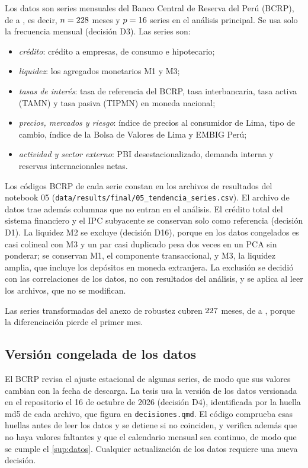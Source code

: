 Los datos son \nSeries{} series mensuales del Banco Central de Reserva del Perú (BCRP), de
\fechaInicioNiveles{} a \fechaFinDatos{}, es decir, $n=228$ meses y $p=16$ series
en el análisis principal. Se usa solo la frecuencia mensual (decisión D3). Las series son:

\begin{itemize}[leftmargin=*]
  \item \emph{crédito}: crédito a empresas, de consumo e hipotecario;
  \item \emph{liquidez}: los agregados monetarios M1 y M3;
  \item \emph{tasas de interés}: tasa de referencia del BCRP, tasa interbancaria, tasa activa (TAMN)
    y tasa pasiva (TIPMN) en moneda nacional;
  \item \emph{precios, mercados y riesgo}: índice de precios al consumidor de Lima, tipo de cambio,
    índice de la Bolsa de Valores de Lima y EMBIG Perú;
  \item \emph{actividad y sector externo}: PBI desestacionalizado, demanda interna y reservas
    internacionales netas.
\end{itemize}

Los códigos BCRP de cada serie constan en los archivos de resultados del notebook 05
(\texttt{data/results/final/05\_tendencia\_series.csv}). El archivo de datos trae además columnas
que no entran en el análisis. El crédito total del sistema financiero y el IPC subyacente se
conservan solo como referencia (decisión D1). La liquidez M2 se excluye (decisión D16), porque en
los datos congelados es casi colineal con M3 y un par casi duplicado pesa dos veces en un PCA sin
ponderar; se conservan M1, el componente transaccional, y M3, la liquidez amplia, que incluye los
depósitos en moneda extranjera. La exclusión se decidió con las correlaciones de los datos, no con
resultados del análisis, y se aplica al leer los archivos, que no se modifican.

Las series transformadas del anexo de robustez cubren $227$ meses, de
\fechaInicioTransformadas{} a \fechaFinDatos{}, porque la diferenciación pierde el primer mes.

\subsection{Versión congelada de los datos}

El BCRP revisa el ajuste estacional de algunas series, de modo que sus valores cambian con la fecha
de descarga. La tesis usa la versión de los datos versionada en el repositorio el 16 de octubre de
2026 (decisión D4), identificada por la huella md5 de cada archivo, que figura en
\texttt{decisiones.qmd}. El código comprueba esas huellas antes de leer los datos y se detiene si
no coinciden, y verifica además que no haya valores faltantes y que el calendario mensual sea
continuo, de modo que se cumple el \cref{sup:datos}. Cualquier actualización de los datos requiere
una nueva decisión.

